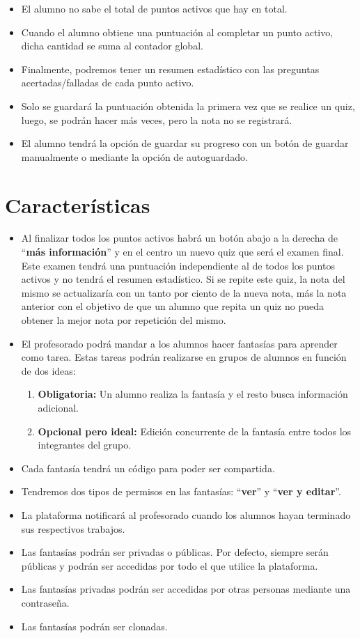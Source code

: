 \begin{itemize}
\begin{itemize}
		\item El alumno no sabe el total de puntos activos que hay en total.
		\item Cuando el alumno obtiene una puntuación al completar un punto activo, dicha cantidad se suma al contador global.
		\item Finalmente, podremos tener un resumen estadístico con las preguntas acertadas/falladas de cada punto activo.
		\item Solo se guardará la puntuación obtenida la primera vez que se realice un quiz, luego, se podrán hacer más veces, pero la nota no se registrará.
		\item El alumno tendrá la opción de guardar su progreso con un botón de guardar manualmente o mediante la opción de autoguardado.
	\end{itemize}
\end{itemize}

\section{Características}
\begin{itemize}
	\item Al finalizar todos los puntos activos habrá un botón abajo a la derecha de ``\textbf{más información}'' y en el centro un nuevo quiz que será el examen final. Este examen tendrá una puntuación independiente al de todos los puntos activos y no tendrá el resumen estadístico. Si se repite este quiz, la nota del mismo se actualizaría con un tanto por ciento de la nueva nota, más la nota anterior con el objetivo de que un alumno que repita un quiz no pueda obtener la mejor nota por repetición del mismo.
	\item El profesorado podrá mandar a los alumnos hacer fantasías para aprender como tarea. Estas tareas podrán realizarse en grupos de alumnos en función de dos ideas:
	\begin{enumerate}
		\item \textbf{Obligatoria:} Un alumno realiza la fantasía y el resto busca información adicional.
		\item \textbf{Opcional pero ideal:} Edición concurrente de la fantasía entre todos los integrantes del grupo.
	\end{enumerate}
	\item Cada fantasía tendrá un código para poder ser compartida.
	\item Tendremos dos tipos de permisos en las fantasías: ``\textbf{ver}'' y ``\textbf{ver y editar}''.
	\item La plataforma notificará al profesorado cuando los alumnos hayan terminado sus respectivos trabajos.
	\item Las fantasías podrán ser privadas o públicas. Por defecto, siempre serán públicas y podrán ser accedidas por todo el que utilice la plataforma.
	\item Las fantasías privadas podrán ser accedidas por otras personas mediante una contraseña.
	\item Las fantasías podrán ser clonadas.
\end{itemize}
